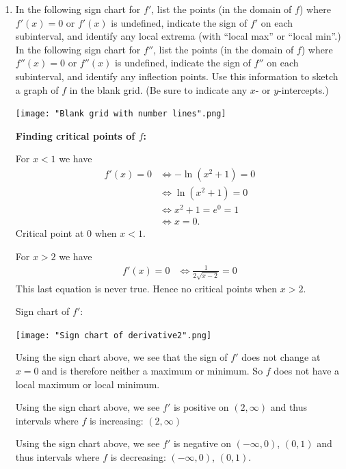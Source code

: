\documentclass[nooutcomes,handout]{ximera}
\begin{document}
\begin{problem}
\begin{enumerate}
    \item
      In the following sign chart for $f'$, list the points (in the domain of $f$) where $f'(x) = 0$ or $f'(x)$ is undefined, indicate the sign of $f'$ on each subinterval, and identify any local extrema (with ``local max'' or ``local min''.)
      In the following sign chart for $f''$, list the points (in the domain of $f$) where $f''(x) = 0$ or $f''(x)$ is undefined, indicate the sign of $f''$ on each subinterval, and identify any inflection points.
      Use this information to sketch a graph of $f$ in the blank grid.
      (Be sure to indicate any $x$- or $y$-intercepts.)
        \begin{image}
          \texttt{[image: "Blank grid with number lines".png]}
        \end{image}
        
           \begin{freeResponse}
        \textbf{Finding critical points of $f$:}

        For $x < 1$ we have
        \begin{align*}
          f'(x) = 0 &\iff -\ln(x^2+1) = 0 \\
          &\iff \ln(x^2+1) = 0\\
          &\iff x^2 + 1 = e^0 = 1\\
          &\iff x = 0.
        \end{align*}
        Critical point at $0$ when $x < 1$.

        For $x > 2$ we have
        \begin{align*}
          f'(x) = 0 &\iff \frac{1}{2\sqrt{x-2}} = 0
        \end{align*}
        This last equation is never true.
        Hence no critical points when $x > 2$.

        Sign chart of $f'$:
        \begin{image}
          \texttt{[image: "Sign chart of derivative2".png]}
        \end{image}
        
        Using the sign chart above, we see that the sign of $f'$ does not change at $x=0$ and is therefore neither a maximum or minimum. So $f$ does not have a local maximum or local minimum.

	Using the sign chart above, we see $f'$ is positive on $(2, \infty)$ and thus intervals where $f$ is increasing: $(2, \infty)$

        Using the sign chart above, we see $f'$ is negative on $(-\infty, 0)$, $(0, 1)$ and thus intervals where $f$ is decreasing: $(-\infty, 0)$, $(0, 1)$.


\end{freeResponse}
\end{enumerate}
\end{problem}
\end{document}

